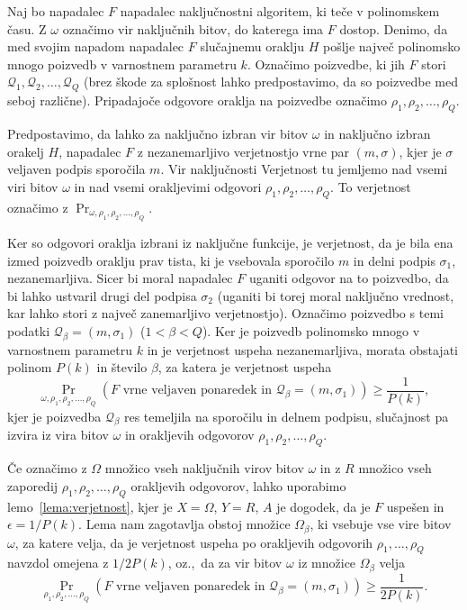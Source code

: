\begin{dokaz}
    Naj bo napadalec $F$ napadalec naključnostni algoritem, ki teče v polinomskem času. Z $\omega$
    označimo vir naključnih bitov, do katerega ima $F$ dostop. Denimo, da med svojim napadom napadalec
    $F$ slučajnemu oraklju $H$ pošlje največ polinomsko mnogo poizvedb v varnostnem parametru $k$.
    Označimo  poizvedbe, ki jih $F$ stori $\mathcal{Q}_1, \mathcal{Q}_2, \dots, \mathcal{Q}_Q$
    (brez škode za splošnost lahko predpostavimo, da so poizvedbe med seboj različne). Pripadajoče
    odgovore oraklja na poizvedbe označimo $\rho_1, \rho_2 , \dots, \rho_Q$.

    Predpostavimo, da lahko za naključno izbran vir bitov $\omega$ in naključno izbran orakelj $H$,
    napadalec $F$ z nezanemarljivo verjetnostjo vrne par $(m, \sigma)$, kjer je $\sigma$ veljaven podpis
    sporočila $m$. Vir naključnosti 
    Verjetnost tu jemljemo nad vsemi viri bitov $\omega$ in nad vsemi orakljevimi
    odgovori $\rho_1, \rho_2, \dots, \rho_Q$. To verjetnost označimo z $\Pr_{\omega, \rho_1,
    \rho_2 , \dots, \rho_Q}$.

    Ker so odgovori oraklja izbrani iz naključne funkcije, je verjetnost, da je bila ena izmed
    poizvedb oraklju prav tista, ki je vsebovala sporočilo $m$ in delni podpis $\sigma_1$,
    nezanemarljiva. Sicer bi moral napadalec $F$ uganiti odgovor na to poizvedbo, da bi
    lahko ustvaril drugi del podpisa $\sigma_2$ (uganiti bi torej moral naključno vrednost, kar lahko
    stori z največ zanemarljivo verjetnostjo). Označimo poizvedbo s temi podatki $\mathcal{Q}_\beta
    = (m, \sigma_1)$ ($1 < \beta < Q$). Ker je poizvedb polinomsko mnogo v varnostnem parametru $k$
    in je verjetnost uspeha nezanemarljiva, morata obstajati polinom $P(k)$ in število $\beta$, za
    katera je verjetnost uspeha
    $$
    \Pr_{\omega, \rho_1, \rho_2 , \dots, \rho_Q}(\text{$F$ vrne veljaven ponaredek in } \mathcal{Q}_\beta
    = (m, \sigma_1)) \geq \frac{1}{P(k)},
    $$
    kjer je poizvedba $\mathcal{Q}_\beta$ res temeljila na sporočilu in delnem podpisu, slučajnost
    pa izvira iz vira bitov $\omega$ in orakljevih odgovorov $\rho_1, \rho_2, \dots, \rho_Q$.

    Če označimo z $\Omega$ množico vseh naključnih virov bitov $\omega$ in z $R$ množico vseh
    zaporedij $\rho_1, \rho_2, \dots, \rho_Q$ orakljevih odgovorov, lahko uporabimo lemo~\ref{lema:verjetnost},
    kjer je $X = \Omega$, $Y = R$, $A$ je dogodek, da je $F$ uspešen in $\epsilon = 1/P(k)$.
    Lema nam zagotavlja obstoj množice $\Omega_\beta$, ki vsebuje vse vire bitov $\omega$, za katere
    velja, da je verjetnost uspeha po orakljevih odgovorih $\rho_1, \dots, \rho_Q$ navzdol omejena z
    $1/2P(k)$, oz.,\ da za vir bitov $\omega$ iz množice $\Omega_\beta$ velja
    $$
    \Pr_{\rho_1, \rho_2, \dots, \rho_Q}(\text{$F$ vrne veljaven ponaredek in } \mathcal{Q}_\beta
    = (m, \sigma_1)) \geq \frac{1}{2P(k)}.
    $$


\end{dokaz}
